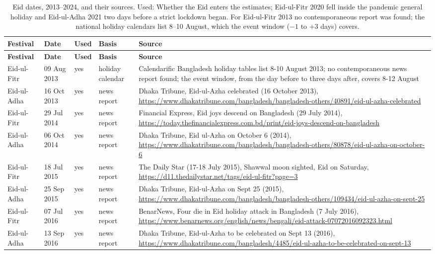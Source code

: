 \begingroup\scriptsize
\begin{longtable}{L{2.0cm} L{1.8cm} C{0.8cm} L{1.8cm} L{8.6cm}}
\caption{Eid dates, 2013--2024, and their sources. Used: Whether the Eid enters the estimates; Eid-ul-Fitr 2020 fell inside the pandemic general holiday and Eid-ul-Adha 2021 two days before a strict lockdown began. For Eid-ul-Fitr 2013 no contemporaneous report was found; the national holiday calendars list 8--10 August, which the event window ($-1$ to $+3$ days) covers.}\label{tab:s-eid-dates}\\
\toprule
\textbf{Festival} & \textbf{Date} & \textbf{Used} & \textbf{Basis} & \textbf{Source} \\
\midrule\endfirsthead
\toprule
\textbf{Festival} & \textbf{Date} & \textbf{Used} & \textbf{Basis} & \textbf{Source} \\
\midrule\endhead
\bottomrule\endfoot
Eid-ul-Fitr & 09 Aug 2013 & yes & holiday calendar & Calendarific Bangladesh holiday tables list 8-10 August 2013; no contemporaneous news report found; the event window, from the day before to three days after, covers 8-12 August \\
Eid-ul-Adha & 16 Oct 2013 & yes & news report & Dhaka Tribune, Eid-ul-Azha celebrated (16 October 2013), \url{https://www.dhakatribune.com/bangladesh/bangladesh-others/40891/eid-ul-azha-celebrated} \\
Eid-ul-Fitr & 29 Jul 2014 & yes & news report & Financial Express, Eid joys descend on Bangladesh (29 July 2014), \url{https://today.thefinancialexpress.com.bd/print/eid-joys-descend-on-bangladesh} \\
Eid-ul-Adha & 06 Oct 2014 & yes & news report & Dhaka Tribune, Eid ul-Azha on October 6 (2014), \url{https://www.dhakatribune.com/bangladesh/bangladesh-others/80878/eid-ul-azha-on-october-6} \\
Eid-ul-Fitr & 18 Jul 2015 & yes & news report & The Daily Star (17-18 July 2015), Shawwal moon sighted, Eid on Saturday, \url{https://d11.thedailystar.net/tags/eid-ul-fitr?page=3} \\
Eid-ul-Adha & 25 Sep 2015 & yes & news report & Dhaka Tribune, Eid-ul-Azha on Sept 25 (2015), \url{https://www.dhakatribune.com/bangladesh/bangladesh-others/109434/eid-ul-azha-on-sept-25} \\
Eid-ul-Fitr & 07 Jul 2016 & yes & news report & BenarNews, Four die in Eid holiday attack in Bangladesh (7 July 2016), \url{https://www.benarnews.org/english/news/bengali/eid-attack-07072016092323.html} \\
Eid-ul-Adha & 13 Sep 2016 & yes & news report & Dhaka Tribune, Eid-ul-Azha to be celebrated on Sept 13 (2016), \url{https://www.dhakatribune.com/bangladesh/4485/eid-ul-azha-to-be-celebrated-on-sept-13} \\

\end{longtable}

